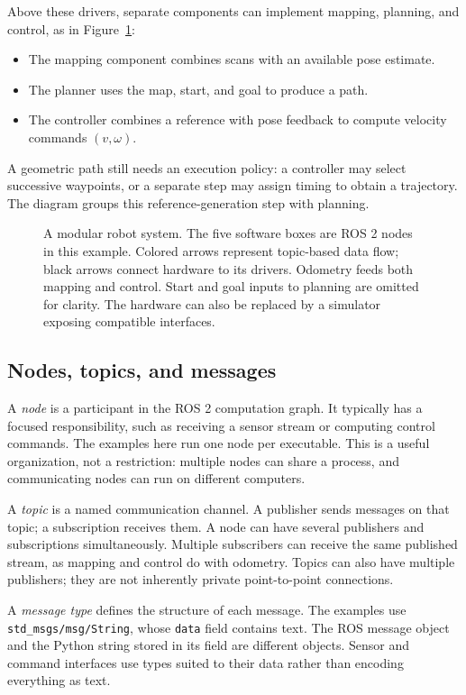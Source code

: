 Above these drivers, separate components can implement mapping, planning,
and control, as in Figure~\ref{fig:l14-architecture}:
\begin{itemize}
\item The mapping component combines scans with an available pose estimate.
\item The planner uses the map, start, and goal to produce a path.
\item The controller combines a reference with pose feedback to compute
velocity commands $(v,\omega)$.
\end{itemize}
A geometric path still needs an execution policy: a controller may select
successive waypoints, or a separate step may assign timing to obtain a
trajectory. The diagram groups this reference-generation step with planning.

\begin{figure}[htbp]
\centering
\caption{A modular robot system. The five software boxes are ROS 2 nodes
in this example. Colored arrows represent topic-based data flow; black
arrows connect hardware to its drivers. Odometry feeds both mapping and
control. Start and goal inputs to planning are omitted for clarity.
The hardware can also be replaced by a simulator exposing compatible
interfaces.}
\label{fig:l14-architecture}
\end{figure}

\subsection{Nodes, topics, and messages}
A \emph{node} is a participant in the ROS 2 computation graph. It typically
has a focused responsibility, such as receiving a sensor stream or computing
control commands. The examples here run one node per executable. This is
a useful organization, not a restriction: multiple nodes can share a process,
and communicating nodes can run on different computers.

A \emph{topic} is a named communication channel. A publisher sends messages
on that topic; a subscription receives them. A node can have several
publishers and subscriptions simultaneously. Multiple subscribers can
receive the same published stream, as mapping and control do with odometry.
Topics can also have multiple publishers; they are not inherently private
point-to-point connections.

A \emph{message type} defines the structure of each message. The examples
use \texttt{std\_msgs/msg/String}, whose \texttt{data} field contains text.
The ROS message object and the Python string stored in its field are
different objects. Sensor and command interfaces use types suited to their
data rather than encoding everything as text.

